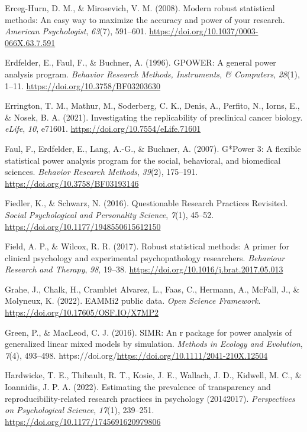 \documentclass[
  man]{apa7}
\newlength{\cslhangindent}
\newenvironment{CSLReferences}[2] %
 {\begin{list}{}{%
  \setlength{\itemindent}{0pt}
  \setlength{\leftmargin}{0pt}
  \setlength{\parsep}{0pt}
  \ifodd #1
   \setlength{\leftmargin}{\cslhangindent}
   \setlength{\itemindent}{-1\cslhangindent}
  \fi
  \setlength{\itemsep}{#2\baselineskip}}}
 {\end{list}}
\begin{document}
\begin{CSLReferences}{1}{0}
Erceg-Hurn, D. M., \& Mirosevich, V. M. (2008). Modern robust statistical methods: An easy way to maximize the accuracy and power of your research. \emph{American Psychologist}, \emph{63}(7), 591--601. \url{https://doi.org/10.1037/0003-066X.63.7.591}

Erdfelder, E., Faul, F., \& Buchner, A. (1996). GPOWER: A general power analysis program. \emph{Behavior Research Methods, Instruments, \& Computers}, \emph{28}(1), 1--11. \url{https://doi.org/10.3758/BF03203630}

Errington, T. M., Mathur, M., Soderberg, C. K., Denis, A., Perfito, N., Iorns, E., \& Nosek, B. A. (2021). Investigating the replicability of preclinical cancer biology. \emph{eLife}, \emph{10}, e71601. \url{https://doi.org/10.7554/eLife.71601}

Faul, F., Erdfelder, E., Lang, A.-G., \& Buchner, A. (2007). G*Power 3: A flexible statistical power analysis program for the social, behavioral, and biomedical sciences. \emph{Behavior Research Methods}, \emph{39}(2), 175--191. \url{https://doi.org/10.3758/BF03193146}

Fiedler, K., \& Schwarz, N. (2016). Questionable Research Practices Revisited. \emph{Social Psychological and Personality Science}, \emph{7}(1), 45--52. \url{https://doi.org/10.1177/1948550615612150}

Field, A. P., \& Wilcox, R. R. (2017). Robust statistical methods: A primer for clinical psychology and experimental psychopathology researchers. \emph{Behaviour Research and Therapy}, \emph{98}, 19--38. \url{https://doi.org/10.1016/j.brat.2017.05.013}

Grahe, J., Chalk, H., Cramblet Alvarez, L., Faas, C., Hermann, A., McFall, J., \& Molyneux, K. (2022). EAMMi2 public data. \emph{Open Science Framework}. \url{https://doi.org/10.17605/OSF.IO/X7MP2}

Green, P., \& MacLeod, C. J. (2016). SIMR: An r package for power analysis of generalized linear mixed models by simulation. \emph{Methods in Ecology and Evolution}, \emph{7}(4), 493--498. https://doi.org/\url{https://doi.org/10.1111/2041-210X.12504}

Hardwicke, T. E., Thibault, R. T., Kosie, J. E., Wallach, J. D., Kidwell, M. C., \& Ioannidis, J. P. A. (2022). Estimating the prevalence of transparency and reproducibility-related research practices in psychology (2014{\textendash}2017). \emph{Perspectives on Psychological Science}, \emph{17}(1), 239--251. \url{https://doi.org/10.1177/1745691620979806}


\end{CSLReferences}
\end{document}
